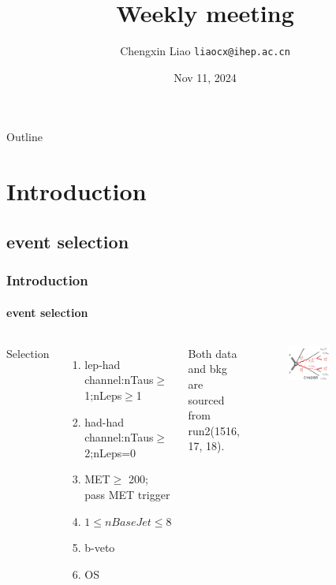 \documentclass[usenames,dvipsnames]{beamer}
\title[Weekly meeting]{Weekly meeting}
\date[Nov 13, 2024]{Nov 11, 2024}
\author[Chengxin Liao]{
  Chengxin Liao
  \pdfnewline
  \texttt{liaocx@ihep.ac.cn}
}
\institute{Department of Physics, Shandong University}
\begin{document}
\begin{frame}
\titlepage
\end{frame}

\begin{frame}{Outline}
\tableofcontents
\end{frame}

\section{Introduction}
\subsection{event selection}
\begin{frame}
\frametitle{Introduction}
\framesubtitle{event selection}
\begin{columns}
    \raggedright
    Selection
	\begin{enumerate}[\textbullet]
    \item lep-had channel:nTaus$\geq$1;nLeps$\geq$1
    
    \item had-had channel:nTaus$\geq$2;nLeps=0
    
    \item MET$\geq$ 200; pass MET trigger
    
    \item $1\leq nBaseJet\leq 8$
     
    \item b-veto
    
    \item OS
    \end{enumerate}
    \vskip 0.2cm
    
%    
    Both data and bkg are sourced from run2(1516, 17, 18).
%    
    
    \raggedleft
    \begin{figure}
    \includegraphics[width = 0.5\textwidth]{graphics/Feynman diagram.png}
    \end{figure}
 \end{columns}

\end{frame}
\end{document}
